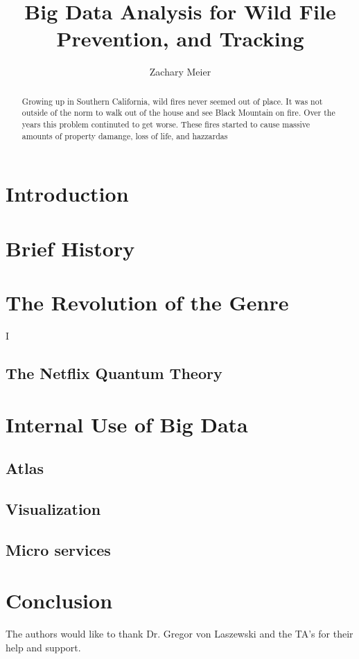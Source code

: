 \documentclass[sigconf]{acmart}
\begin{document}
\title{Big Data Analysis for Wild File Prevention, and Tracking}
\author{Zachary Meier}
\renewcommand{\shortauthors}{Z. Meier et al.}
\begin{abstract}
Growing up in Southern California, wild fires never seemed out of place.  It was not outside of the norm to walk out of the house and see Black Mountain on fire.  Over the years this problem continuted to get worse.  These fires started to cause massive amounts of property damange, loss of life, and hazzardas 
\end{abstract}
\maketitle
\section{Introduction}

\section{Brief History}

\section{The Revolution of the Genre}
I
\subsection{The Netflix Quantum Theory}

\section{Internal Use of Big Data}

\subsection{Atlas}

\subsection{Visualization}


\subsection{Micro services}

\section{Conclusion}

\begin{acks}
  The authors would like to thank Dr. Gregor von Laszewski and the TA's for their help and support.
\end{acks}

 
\end{document}

